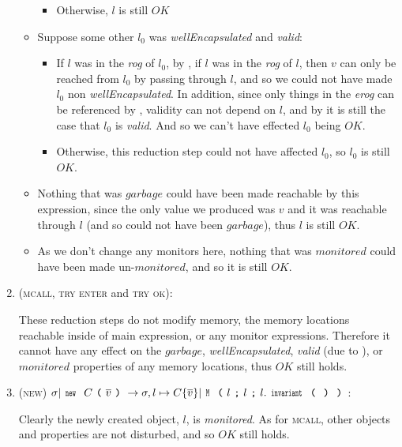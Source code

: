 \begin{enumerate}
\begin{itemize}
\begin{itemize}
		    \item Otherwise, $l$ is still $\mathit{OK}$
    	\end{itemize}

	\item Suppose some other $l_0$ was \emph{wellEncapsulated} and \emph{valid}:
	\begin{itemize}
			\item If $l$ was in the \emph{rog} of $l_0$, by , if $l$ was in the \emph{rog} of $l$, then $v$ can only be reached from $l_0$ by passing through $l$, and so we could not have made $l_0$ non \emph{wellEncapsulated}. In addition, since only things in the \emph{erog} can be referenced by \Q@invariant@, validity can not depend on $l$, and by  it is still the case that $l_0$ is \emph{valid}. And so we can't have effected $l_0$ being $\mathit{OK}$.
			\item Otherwise, this reduction step could not have affected $l_0$, so $l_0$ is still $\mathit{OK}$.
	\end{itemize}


	\item Nothing that was $\mathit{garbage}$ could have been made reachable by this expression, since the only value we produced was $v$ and it was reachable through $l$ (and so could not have been $\mathit{garbage}$), thus $l$ is still $\mathit{OK}$.

	\item As we don't change any monitors here, nothing that was $\mathit{monitored}$ could have been made un-$\mathit{monitored}$, and so it is still $\mathit{OK}$.
\end{itemize}

\item (\textsc{mcall}, \textsc{try enter} and \textsc{try ok}):

	These reduction steps do not modify memory, the memory locations reachable inside of main expression, or any monitor expressions. Therefore it cannot have any effect on the $\mathit{garbage}$, \emph{wellEncapsulated}, \emph{valid} (due to ), or $\mathit{monitored}$ properties of any memory locations, thus $\mathit{OK}$ still holds.

\item (\textsc{new}) $\sigma|\Kw{new}\ C\oR\vs\cR\rightarrow \sigma,l\mapsto C\{\vs\}| \M{l}{l}{l.\invariant}$:

	Clearly the newly created object, $l$, is \emph{monitored}. As for \textsc{mcall}, other objects and properties are not disturbed, and so $\mathit{OK}$ still holds.



\end{enumerate}
